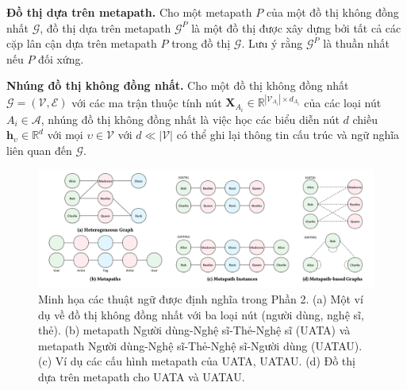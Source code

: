 \begin{definition}
  \textbf{Đồ thị dựa trên metapath.} Cho một metapath $P$ của một đồ thị không đồng nhất $\pmb{\mathcal{G}}$, đồ thị dựa trên metapath $\pmb{\mathcal{G}}^P$ là một đồ thị được xây dựng bởi tất cả các cặp lân cận dựa trên metapath $P$ trong đồ thị $\pmb{\mathcal{G}}$. Lưu ý rằng $\pmb{\mathcal{G}}^P$ là thuần nhất nếu $P$ đối xứng.
\end{definition}

\begin{definition}
  \textbf{Nhúng đồ thị không đồng nhất.} Cho một đồ thị không đồng nhất $\pmb{\mathcal{G}} = (\pmb{\mathcal{V}}, \pmb{\mathcal{E}})$ với các ma trận thuộc tính nút $\pmb{X}_{A_i} \in \mathbb{R} ^ {|\pmb{\mathcal{V}}_{A_i}| \times d_{A_i}}$ của các loại nút $A_i \in \pmb{\mathcal{A}}$, nhúng đồ thị không đồng nhất là việc học các biểu diễn nút $d$ chiều $\pmb{h}_{\upsilon} \in \mathbb{R}^d$ với mọi $\upsilon \in \pmb{\mathcal{V}}$ với $d \ll |\pmb{\mathcal{V}}|$ có thể ghi lại thông tin cấu trúc và ngữ nghĩa liên quan đến $\pmb{\mathcal{G}}$.
\end{definition}

\begin{figure}
  \includegraphics[width=\textwidth]{figs/fig1.png}
  \caption{Minh họa các thuật ngữ được định nghĩa trong Phần 2. (a) Một ví dụ về đồ thị không đồng nhất với ba loại nút (người dùng, nghệ sĩ, thẻ). (b) metapath Người dùng-Nghệ sĩ-Thẻ-Nghệ sĩ (UATA) và metapath Người dùng-Nghệ sĩ-Thẻ-Nghệ sĩ-Người dùng (UATAU). (c) Ví dụ các cấu hình metapath của UATA, UATAU. (d) Đồ thị dựa trên metapath cho UATA và UATAU.}
\end{figure}



